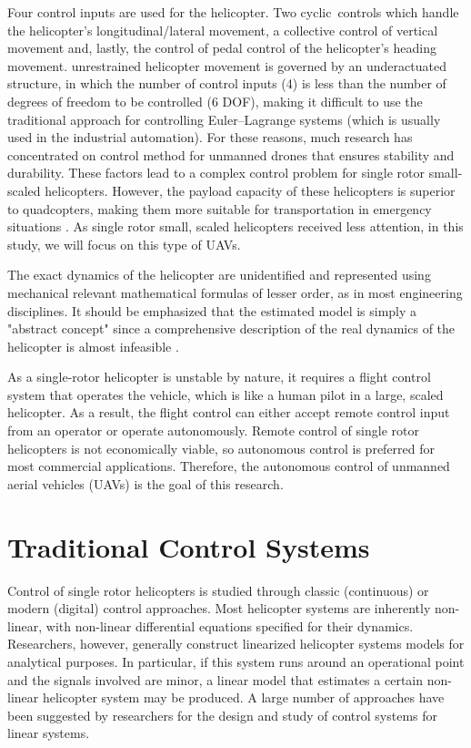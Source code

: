 Four control inputs are used for the helicopter. Two cyclic controls which handle the helicopter's longitudinal/lateral movement, a collective control of vertical movement and, lastly, the control of pedal control of the helicopter's heading movement. unrestrained helicopter movement is governed by an underactuated structure, in which the number of control inputs (4) is less than the number of degrees of freedom to be controlled (6 DOF), making it difficult to use the traditional approach for controlling Euler–Lagrange systems (which is usually used in the industrial automation).  For these reasons, much research has concentrated on control method for unmanned drones that ensures stability and durability. These factors lead to a complex control problem for single rotor small-scaled helicopters. However, the payload capacity of these helicopters is superior to quadcopters, making them more suitable for transportation in emergency situations \cite{quan2017introduction}. As single rotor small, scaled helicopters received less attention, in this study, we will focus on this type of UAVs. 

The exact dynamics of the helicopter are unidentified and represented using mechanical relevant mathematical formulas of lesser order, as in most engineering disciplines. It should be emphasized that the estimated model is simply a "abstract concept" since a comprehensive description of the real dynamics of the helicopter is almost infeasible \cite{ren2012modeling}. 

As a single-rotor helicopter is unstable by nature, it requires a flight control system that operates the vehicle, which is like a human pilot in a large, scaled helicopter. As a result, the flight control can either accept remote control input from an operator or operate autonomously. Remote control of single rotor helicopters is not economically viable, so autonomous control is preferred for most commercial applications. Therefore, the autonomous control of unmanned aerial vehicles (UAVs) is the goal of this research.  

\section{Traditional Control Systems}

Control of single rotor helicopters is studied through classic (continuous) or modern (digital) control approaches. Most helicopter systems are inherently non-linear, with non-linear differential equations specified for their dynamics. Researchers, however, generally construct linearized helicopter systems models for analytical purposes. In particular, if this system runs around an operational point and the signals involved are minor, a linear model that estimates a certain non-linear helicopter system may be produced. A large number of approaches have been suggested by researchers for the design and study of control systems for linear systems. 

